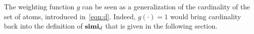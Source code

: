   The weighting function \(g\) can be seen as a generalization of the cardinality of the set of atoms, introduced in~\eqref{eqn:d}.
  Indeed, \(g(\cdot) = 1\) would bring cardinality back into the definition of \(\mathbf{simi}_d\) that is given in the following section.


